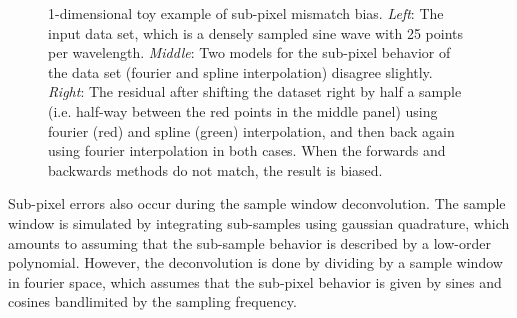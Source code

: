 \documentclass{article}
\begin{document}
\begin{figure}[h!]
\begin{tabular}{m{59mm}m{59mm}m{59mm}}
	\end{tabular}
	\caption{1-dimensional toy example of sub-pixel mismatch bias.
	\emph{Left}: The input data set, which is a densely sampled sine wave with
	25 points per wavelength. \emph{Middle}: Two models for the sub-pixel behavior
	of the data set (fourier and spline interpolation) disagree slightly.
	\emph{Right}: The residual after shifting the dataset right by half a sample
	(i.e. half-way between the red points in the middle panel) using fourier
	(red) and spline (green) interpolation, and then back again using fourier interpolation
	in both cases. When the forwards and backwards methods do not match, the result is biased.}
	\label{fig:iptoy}
\end{figure}

Sub-pixel errors also occur during the sample window deconvolution.
The sample window is simulated by integrating sub-samples using
gaussian quadrature, which amounts to assuming that the sub-sample
behavior is described by a low-order polynomial. However, the
deconvolution is done by dividing by a sample window in fourier space,
which assumes that the sub-pixel behavior is given by sines and
cosines bandlimited by the sampling frequency.
\end{document}
